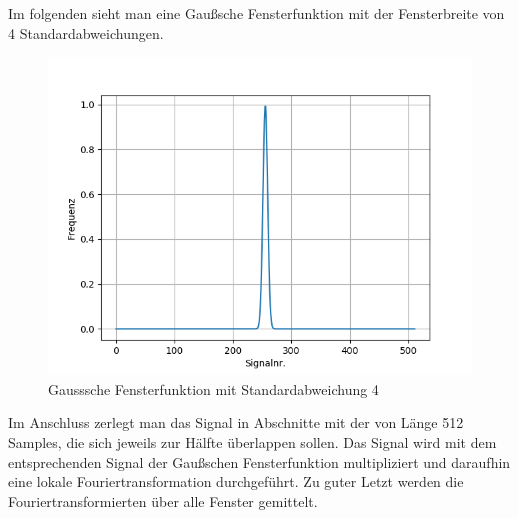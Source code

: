 \documentclass[12pt, oneside, a4paper, \docLanguage]{report}
\begin{document}
Im folgenden sieht man eine Gaußsche Fensterfunktion mit der Fensterbreite von 4 Standardabweichungen.
\begin{figure}[H]
	\centering
	\includegraphics[width=.7\linewidth]{../data/img/gauss.png}
	\caption{Gausssche Fensterfunktion mit Standardabweichung 4}
	\label{img:Gausssche Fensterfunktion mit Standardabweichung 4}
\end{figure}
Im Anschluss zerlegt man das Signal in Abschnitte mit der von Länge 512 Samples, die sich jeweils zur Hälfte überlappen sollen.
Das Signal wird mit dem entsprechenden Signal der Gaußschen Fensterfunktion multipliziert und daraufhin eine lokale Fouriertransformation durchgeführt.
Zu guter Letzt werden die Fouriertransformierten über alle Fenster gemittelt.
\end{document}
